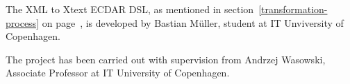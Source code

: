 The XML to Xtext ECDAR DSL, as mentioned in section~\ref{transformation-process} on page~\pageref{transformation-process}, is developed by Bastian M\"uller, student at IT Unviversity of Copenhagen.

The project has been carried out with supervision from Andrzej Wasowski, Associate Professor at IT University of Copenhagen.
